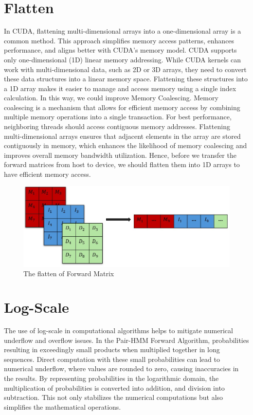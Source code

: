\documentclass[PhD]{PHlab-thesis}
\begin{document}
\section{Flatten}
In CUDA, flattening multi-dimensional arrays into a one-dimensional array is a common method. This approach simplifies memory access patterns, enhances performance, and aligns better with CUDA’s memory model. CUDA supports only one-dimensional (1D) linear memory addressing. While CUDA kernels can work with multi-dimensional data, such as 2D or 3D arrays, they need to convert these data structures into a linear memory space. Flattening these structures into a 1D array makes it easier to manage and access memory using a single index calculation. In this way, we could improve Memory Coalescing. Memory coalescing is a mechanism that allows for efficient memory access by combining multiple memory operations into a single transaction. For best performance, neighboring threads should access contiguous memory addresses. Flattening multi-dimensional arrays ensures that adjacent elements in the array are stored contiguously in memory, which enhances the likelihood of memory coalescing and improves overall memory bandwidth utilization. Hence, before we transfer the forward matrices from host to device, we should flatten them into 1D arrays to have efficient memory access.

\begin{figure}[h]
    \centering
    \includegraphics[width=1\linewidth]{figure/Flatten.jpg}
    \caption{The flatten of Forward Matrix}
    \label{fig:flatten}
\end{figure}


\section{Log-Scale}
The use of log-scale in computational algorithms helps to mitigate numerical underflow and overflow issues. In the Pair-HMM Forward Algorithm, probabilities resulting in exceedingly small products when multiplied together in long sequences. Direct computation with these small probabilities can lead to numerical underflow, where values are rounded to zero, causing inaccuracies in the results. By representing probabilities in the logarithmic domain, the multiplication of probabilities is converted into addition, and division into subtraction. This not only stabilizes the numerical computations but also simplifies the mathematical operations.
\end{document}

